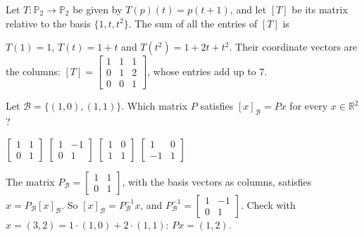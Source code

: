 \begin{question}[id=lt-15, marks=2]
Let $T : \mathbb{P}_2 \to \mathbb{P}_2$ be given by $T(p)(t) = p(t + 1)$, and let $[T]$ be its matrix relative to the basis $\{1, t, t^2\}$. The sum of all the entries of $[T]$ is
\begin{solution}
$T(1) = 1$, $T(t) = 1 + t$ and $T(t^2) = 1 + 2t + t^2$. Their coordinate vectors are the columns: $[T] = \begin{bmatrix} 1 & 1 & 1 \\ 0 & 1 & 2 \\ 0 & 0 & 1 \end{bmatrix}$, whose entries add up to 7.
\end{solution}
\end{question}

\begin{question}[id=lt-16, marks=2]
Let $\mathcal{B} = \{(1, 0), (1, 1)\}$. Which matrix $P$ satisfies $[x]_{\mathcal{B}} = Px$ for every $x \in \mathbb{R}^2$?
\begin{options}
  \option $\begin{bmatrix} 1 & 1 \\ 0 & 1 \end{bmatrix}$
  \correct $\begin{bmatrix} 1 & -1 \\ 0 & 1 \end{bmatrix}$
  \option $\begin{bmatrix} 1 & 0 \\ 1 & 1 \end{bmatrix}$
  \option $\begin{bmatrix} 1 & 0 \\ -1 & 1 \end{bmatrix}$
\end{options}
\begin{solution}
The matrix $P_{\mathcal{B}} = \begin{bmatrix} 1 & 1 \\ 0 & 1 \end{bmatrix}$, with the basis vectors as columns, satisfies $x = P_{\mathcal{B}}[x]_{\mathcal{B}}$. So $[x]_{\mathcal{B}} = P_{\mathcal{B}}^{-1}x$, and $P_{\mathcal{B}}^{-1} = \begin{bmatrix} 1 & -1 \\ 0 & 1 \end{bmatrix}$. Check with $x = (3, 2) = 1 \cdot (1, 0) + 2 \cdot (1, 1)$: $Px = (1, 2)$.
\end{solution}
\end{question}

